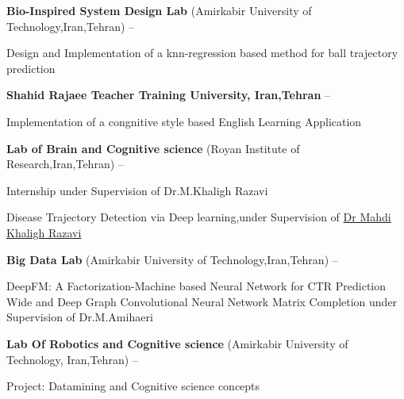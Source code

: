 \documentclass[letterpaper,MMMyyyy,nonstopmode]{simpleresumecv}
\begin{document}
\begin{Body}
\Entry
\href{}
\BulletItem
{\textbf{Bio-Inspired System Design Lab}} 
\newline (Amirkabir University of Technology,Iran,Tehran)
\hfill
{} --
\begin{Detail}
\SubBulletItem
Design and Implementation of a knn-regression based method for ball trajectory prediction 
\end{Detail}


\Entry
\href{}
\BulletItem
{\textbf{Shahid Rajaee Teacher Training University,
Iran,Tehran}}
\hfill
{} --

\begin{Detail}
\SubBulletItem
Implementation of a congnitive style based English Learning Application 
\end{Detail}


\BulletItem
{\textbf{Lab of Brain and Cognitive science}} 
\newline (Royan Institute of Research,Iran,Tehran)
\hfill
{} --
\begin{Detail}
\SubBulletItem
Internship under Supervision of Dr.M.Khaligh Razavi
\end{Detail}
\begin{Detail}
\SubBulletItem
Disease Trajectory Detection via Deep learning,under Supervision of
\href{https://scholar.google.co.uk/citations?user=3HbeiywAAAAJ&hl=en}{Dr Mahdi Khaligh Razavi}
\end{Detail}



\BulletItem
{\textbf{Big Data Lab}} 
\newline (Amirkabir University of Technology,Iran,Tehran)
\hfill
{} --
\begin{Detail}
\SubBulletItem
DeepFM: A Factorization-Machine based Neural Network for CTR Prediction
\SubBulletItem Wide and Deep Graph Convolutional Neural Network Matrix Completion
\newline under Supervision of Dr.M.Amihaeri 
\end{Detail}



\Entry
\href{}
\BulletItem
{\textbf{Lab Of Robotics and Cognitive science}} 
\newline (Amirkabir University of Technology,
Iran,Tehran)
\hfill
{} --


\begin{Detail}
\SubBulletItem
Project: Datamining and Cognitive science concepts


\end{Detail}
\end{Body}
\end{document}
